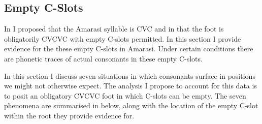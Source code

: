 \subsection{Empty C-Slots}\label{sec:EmpCSlo}
In  I proposed that the Amarasi syllable
is CVC and in  that the foot
is obligatorily CVCVC with empty C-slots permitted.
In this section I provide evidence for the these empty C-slots in Amarasi.
Under certain conditions there are phonetic traces of actual consonants in these empty C-slots.

In this section I discuss seven situations
in which consonants surface in positions we might not otherwise expect.
The analysis I propose to account for this data is
to posit an obligatory CVCVC foot in which C-slots can be empty. 
The seven phenomena are summarised in  below,
along with the location of the empty C-slot within the root they provide evidence for.

\begin{exe}
	\label{ex:EviEmpCsloAma}
		\begin{xlist}
		\end{xlist}
\end{exe}
